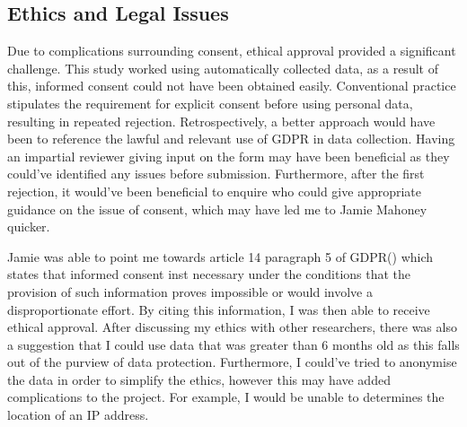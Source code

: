 \subsection{Ethics and Legal Issues}

Due to complications surrounding consent, ethical approval provided a significant challenge. This study worked using automatically collected data, as a result of this, informed consent could not have been obtained easily. Conventional practice stipulates the requirement for explicit consent before using personal data, resulting in repeated rejection. Retrospectively, a better approach would have been to reference the lawful and relevant use of GDPR in data collection. Having an impartial reviewer giving input on the form may have been beneficial as they could've identified any issues before submission. Furthermore, after the first rejection, it would've been beneficial to enquire who could give appropriate guidance on the issue of consent, which may have led me to Jamie Mahoney quicker. 

Jamie was able to point me towards article 14 paragraph 5 of GDPR(\cite{european_commission_regulation_2016}) which states that informed consent inst necessary under the conditions that the provision of such information proves impossible or would involve a disproportionate effort. By citing this information, I was then able to receive ethical approval. After discussing my ethics with other researchers, there was also a suggestion that I could use data that was greater than 6 months old as this falls out of the purview of data protection. Furthermore, I could've tried to anonymise the data in order to simplify the ethics, however this may have added complications to the project. For example, I would be unable to determines the location of an IP address.